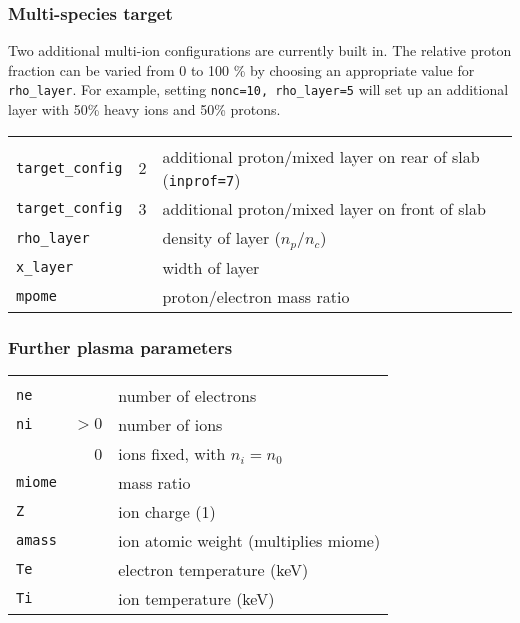 \documentclass[11pt]{article}
\begin{document}
\subsubsection{Multi-species target} 
Two additional multi-ion configurations are currently built in.  The relative proton fraction can be
varied from 0 to 100 \% by choosing an appropriate value for \texttt{rho\_layer}.  For example, setting 
\texttt{nonc=10, rho\_layer=5} will set up an additional layer with 50\% heavy ions and 50\% protons.

\begin{tabular}{lrl}
\hline\\
\texttt{target\_config}& 2 & additional proton/mixed layer on rear of slab (\texttt{inprof=7}) \\ 
\texttt{target\_config}& 3 & additional proton/mixed layer on front of slab \\ 
\texttt{rho\_layer} & & density of layer ($n_p/n_c$) \\
\texttt{x\_layer} & & width of layer \\
\texttt{mpome} & & proton/electron mass ratio \\ 

\end{tabular}

\subsubsection{Further plasma parameters} 
\begin{tabular}{lrl}
\hline\\
\texttt{ne}& & number of electrons\\ 
\texttt{ni} & $>0$ & number of ions \\
	    & 0 & ions fixed, with $n_i=n_0$ \\ 
\texttt{miome} & & mass ratio \\ 
\texttt{Z} & & ion charge (1) \\ 
\texttt{amass} & & ion atomic weight (multiplies miome) \\ 
\texttt{Te} & & electron temperature (keV)\\ 
\texttt{Ti} & & ion temperature (keV)\\
\end{tabular}
\end{document}
